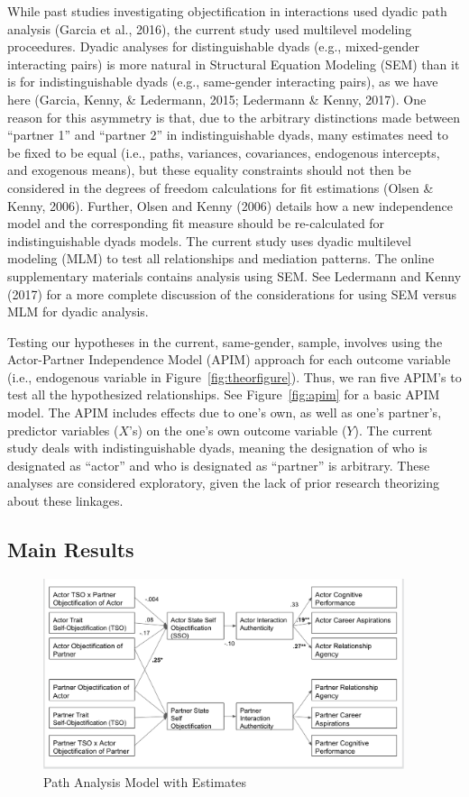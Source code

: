 \documentclass[man]{apa6}
\begin{document}
While past studies investigating objectification in interactions used
dyadic path analysis (Garcia et al., 2016), the current study used
multilevel modeling proceedures. Dyadic analyses for distinguishable
dyads (e.g., mixed-gender interacting pairs) is more natural in
Structural Equation Modeling (SEM) than it is for indistinguishable
dyads (e.g., same-gender interacting pairs), as we have here (Garcia,
Kenny, \& Ledermann, 2015; Ledermann \& Kenny, 2017). One reason for
this asymmetry is that, due to the arbitrary distinctions made between
\enquote{partner 1} and \enquote{partner 2} in indistinguishable dyads,
many estimates need to be fixed to be equal (i.e., paths, variances,
covariances, endogenous intercepts, and exogenous means), but these
equality constraints should not then be considered in the degrees of
freedom calculations for fit estimations (Olsen \& Kenny, 2006).
Further, Olsen and Kenny (2006) details how a new independence model and
the corresponding fit measure should be re-calculated for
indistinguishable dyads models. The current study uses dyadic multilevel
modeling (MLM) to test all relationships and mediation patterns. The
online supplementary materials contains analysis using SEM. See
Ledermann and Kenny (2017) for a more complete discussion of the
considerations for using SEM versus MLM for dyadic analysis.

Testing our hypotheses in the current, same-gender, sample, involves
using the Actor-Partner Independence Model (APIM) approach for each
outcome variable (i.e., endogenous variable in
Figure~\ref{fig:theorfigure}). Thus, we ran five APIM's to test all the
hypothesized relationships. See Figure~\ref{fig:apim} for a basic APIM
model. The APIM includes effects due to one's own, as well as one's
partner's, predictor variables (\(X\)'s) on the one's own outcome
variable (\(Y\)). The current study deals with indistinguishable dyads,
meaning the designation of who is designated as \enquote{actor} and who
is designated as \enquote{partner} is arbitrary. These analyses are
considered exploratory, given the lack of prior research theorizing
about these linkages.

\subsection{Main Results}\label{main-results}

\begin{figure}
\includegraphics[width=400px]{SEMfigure} \caption{Path Analysis Model with Estimates}\label{fig:semfigure}
\end{figure}
\end{document}

